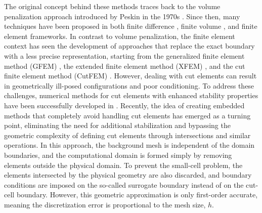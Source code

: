 \documentclass{article}
\begin{document}
The original concept behind these methods traces back to the volume penalization approach introduced by Peskin in the 1970s \cite{peskin1977numerical,peskin2002immersed}. Since then, many techniques have been proposed in both finite difference \cite{leveque1994immersed,mittal2005immersed}, finite volume \cite{cottet2008eulerian,ciallella2025semi}, and finite element \cite{boffi2003finite,boffi2015finite} frameworks. In contrast to volume penalization, the finite element context has seen the development of approaches that replace the exact boundary with a less precise representation, starting from the generalized finite element method (GFEM) \cite{strouboulis2000design}, the extended finite element method (XFEM) \cite{hansbo2002unfitted}, and the cut finite element method (CutFEM) \cite{burman2015cutfem}. However, dealing with cut elements can result in geometrically ill-posed configurations and poor conditioning. To address these challenges, numerical methods for cut elements with enhanced stability properties have been successfully developed in \cite{burman2010ghost, burman2015cutfem, burman2025cut, burman2014fictitious}. Recently, the idea of creating embedded methods that completely avoid handling cut elements has emerged as a turning point, eliminating the need for additional stabilization and bypassing the geometric complexity of defining cut elements through intersections and similar operations. In this approach, the background mesh is independent of the domain boundaries, and the computational domain is formed simply by removing elements outside the physical domain. To prevent the small-cell problem, the elements intersected by the physical geometry are also discarded, and boundary conditions are imposed on the so-called surrogate boundary instead of on the cut-cell boundary. However, this geometric approximation is only first-order accurate, meaning the discretization error is proportional to the mesh size, $h$.\\
%
\end{document}
